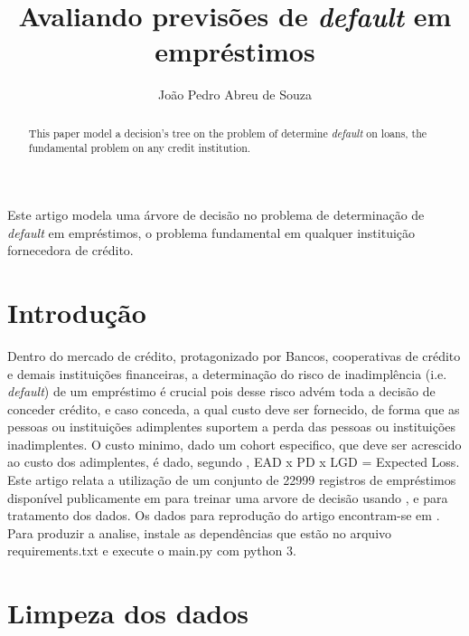 \documentclass[12pt]{article}
\title{Avaliando previsões de \textit{default} em empréstimos}
\author{João Pedro Abreu de Souza\inst{1}}
\begin{document}
 

\maketitle

\begin{abstract}
  This paper model a decision's tree on the problem of determine \textit{default} on loans, the fundamental problem on any credit institution.
\end{abstract}
     
\begin{resumo} 
  Este artigo modela uma árvore de decisão no problema de determinação de \textit{default} em empréstimos, o problema fundamental em qualquer instituição fornecedora de crédito.
  
\end{resumo}


\section{Introdução}

Dentro do mercado de crédito, protagonizado por Bancos, cooperativas de crédito e demais instituições financeiras, a determinação do risco de inadimplência (i.e. \textit{default}) de um empréstimo é crucial pois desse risco advém toda a decisão de conceder crédito, e caso conceda, a qual custo deve ser fornecido, de forma que as pessoas ou instituições adimplentes suportem a perda das pessoas ou instituições inadimplentes. O custo minimo, dado um cohort especifico, que deve ser acrescido ao custo dos adimplentes, é dado, segundo \cite{investopedia}, EAD x PD x LGD = Expected Loss. Este artigo relata a utilização de um conjunto de 22999 registros de empréstimos disponível publicamente em \cite{kaggle} para treinar uma arvore de decisão usando \cite{scikit}, \cite{pandas} e \cite{numpy} para tratamento dos dados. Os dados para reprodução do artigo encontram-se em \cite{repositorio}. Para produzir a analise, instale as dependências que estão no arquivo requirements.txt e execute o main.py com python 3.

\section{Limpeza dos dados} \label{sec:firstpage}
\end{document}
